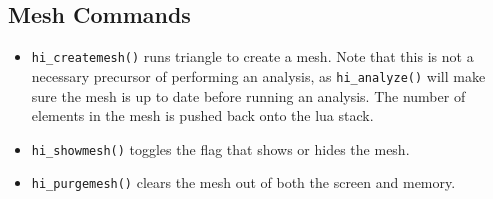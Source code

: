 \subsection{Mesh Commands}

\begin{itemize}
\item \texttt{hi\_createmesh()} runs triangle to create a mesh. Note that this is not
a necessary precursor of performing an analysis, as
\texttt{hi\_analyze()} will make sure the mesh is up to date before
running an analysis. The number of elements in the mesh is pushed
back onto the lua stack.

\item \texttt{hi\_showmesh()} toggles the flag that shows or hides the mesh.

\item \texttt{hi\_purgemesh()} clears the mesh out of both the screen and memory.
\end{itemize}

